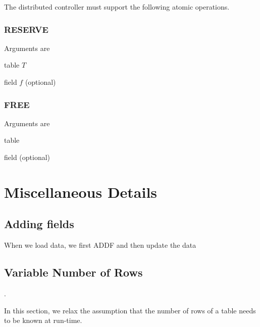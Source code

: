 The distributed controller must support the following atomic operations.

\subsubsection{RESERVE}

Arguments are
\be
\item table \(T\)
\item field \(f\) (optional)
\ee

\subsubsection{FREE}

Arguments are
\be
\item table
\item field (optional)
\ee



\section{Miscellaneous Details}

\subsection{Adding fields}
\label{add_fld}

When we load data, we first ADDF and then update the data 


\subsection{Variable Number of Rows}
\label{Variable_NumRows}.

In this section, we relax the assumption that the number of rows of a
table needs to be known at run-time.

